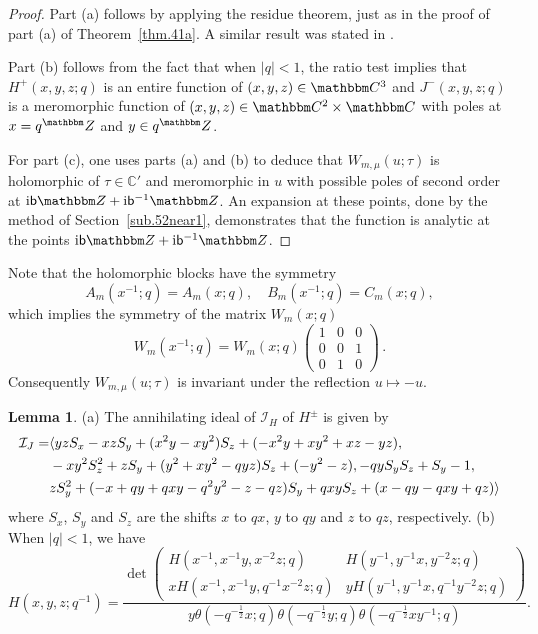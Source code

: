 \documentclass[12pt,reqno]{amsart}
\theoremstyle{definition}
\newtheorem{lemma}[theorem]{Lemma}
\def\BZ{\mathbbm Z}
\def\BC{\mathbbm C}
\def\calI{\mathcal I}
\def\calI{\mathcal I}
\def\th{\theta}
\def\bb{\mathsf{b}}
\def\ri{\mathrm{i}}
\def\ri{{\rm i}}
\def\IC{\mathbb{C}}
\begin{document}
\begin{proof}
  Part (a) follows by applying the residue theorem, just as in the
  proof of part (a) of Theorem~\ref{thm.41a}. A similar result was stated
  in \cite{dimofte-state}.

  Part (b) follows from the fact that when $|q|<1$, the ratio test
  implies that $H^+(x,y,z;q)$ is an entire function of
  $(x,y,z) \in \BC^3$ and $J^-(x,y,z;q)$ is a meromorphic function of
  $(x,y,z) \in \BC^2 \times \BC$ with poles at $x=q^\BZ$ and
  $y \in q^\BZ$.

  For part (c), one uses parts (a) and (b) to deduce that $W_{m,\mu}(u;\tau)$
  is holomorphic of $\tau\in \IC'$ and meromorphic in $u$ with possible
  poles of second order at $\ri \bb \BZ + \ri \bb^{-1} \BZ$.
    An expansion at these points, done by the method of
  Section~\ref{sub.52near1}, demonstrates that the function is analytic
  at the points $\ri \bb \BZ + \ri \bb^{-1} \BZ$.
\end{proof}

Note that the holomorphic blocks have the symmetry
\begin{equation}
  A_m(x^{-1};q) = A_m(x;q),\quad B_m(x^{-1};q) = C_m(x;q),
\end{equation}
which implies the symmetry of the matrix $W_m(x;q)$
\begin{equation}
  W_m(x^{-1};q) = W_m(x;q)
  \begin{pmatrix}
    1&0&0\\0&0&1\\0&1&0
  \end{pmatrix} \,.
  \label{eq:-xWm}
\end{equation}
Consequently $W_{m,\mu}(u;\tau)$ is invariant under the
reflection $u\mapsto -u$.

\begin{lemma}  
  \label{lem.annH}
  \rm{(a)}
  The annihilating ideal of $\calI_H$ of $H^\pm$ is given by
  \begin{align}
  \label{annH}
  \calI_J =& \langle
  y z S_x - x z S_y + (x^2 y - x y^2) S_z + (-x^2 y + x y^2 + x z - y z),
  \\ \notag & -x y^2 S_z^2 + z S_y + (y^2 + x y^2 - q y z) S_z + (-y^2 - z),
  -q y S_y S_z + S_y - 1,
  \\ \notag & z S_y^2  + (-x + q y + 
   q x y - q^2 y^2 - z - q z) S_y + q x y S_z + (x - q y - q x y + q z)
  \rangle
\end{align}
where $S_x$, $S_y$ and $S_z$ are the shifts $x$ to $qx$, $y$ to $qy$
and $z$ to $qz$, respectively.
\newline
\rm{(b)} When $|q|<1$, we have
  \begin{equation}
    H(x,y,z;q^{-1}) = \frac{
      \det
      \begin{pmatrix}
        H(x^{-1},x^{-1}y,x^{-2}z;q) &H(y^{-1},y^{-1}x,y^{-2}z;q)\\
        x H(x^{-1},x^{-1}y,q^{-1}x^{-2}z;q) & y
        H(y^{-1},y^{-1}x,q^{-1}y^{-2}z;q)
      \end{pmatrix}
    }{y\th(-q^{-\frac{1}{2}}x;q)\th(-q^{-\frac{1}{2}}y;q)\th(-q^{-\frac{1}{2}}xy^{-1};q)}.
    \label{eq:H-con}
  \end{equation}
\end{lemma}
\end{document}
